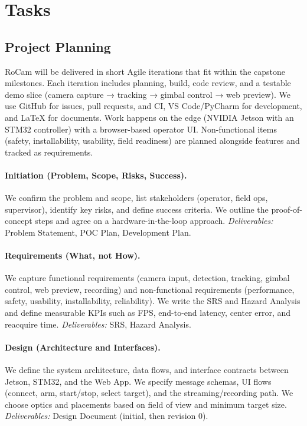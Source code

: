 \documentclass[12pt]{article}
\begin{document}

\section{Tasks}
\subsection{Project Planning}

RoCam will be delivered in short Agile iterations that fit within the capstone
milestones. Each iteration includes planning, build, code review, and a
testable demo slice (camera capture → tracking → gimbal control → web preview).
We use GitHub for issues, pull requests, and CI, VS Code/PyCharm for
development, and LaTeX for documents. Work happens on the edge (NVIDIA Jetson
with an STM32 controller) with a browser-based operator UI. Non-functional
items (safety, installability, usability, field readiness) are planned
alongside features and tracked as requirements.

\paragraph{Initiation (Problem, Scope, Risks, Success).}
We confirm the problem and scope, list stakeholders (operator, field ops,
supervisor), identify key risks, and define success criteria. We outline the
proof-of-concept steps and agree on a hardware-in-the-loop approach.
\emph{Deliverables:} Problem Statement, POC Plan, Development Plan.

\paragraph{Requirements (What, not How).}
We capture functional requirements (camera input, detection, tracking, gimbal
control, web preview, recording) and non-functional requirements (performance,
safety, usability, installability, reliability). We write the SRS and Hazard
Analysis and define measurable KPIs such as FPS, end-to-end latency, center
error, and reacquire time. \emph{Deliverables:} SRS, Hazard Analysis.

\paragraph{Design (Architecture and Interfaces).}
We define the system architecture, data flows, and interface contracts between
Jetson, STM32, and the Web App. We specify message schemas, UI flows (connect,
arm, start/stop, select target), and the streaming/recording path. We choose
optics and placements based on field of view and minimum target size.
\emph{Deliverables:} Design Document (initial, then revision 0).
\end{document}

